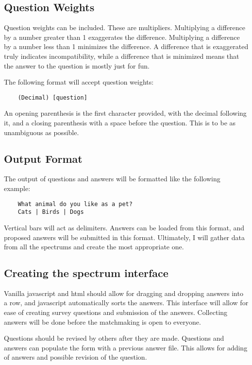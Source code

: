 \documentclass[12pt]{article}
\begin{document}
\subsection{Question Weights}
Question weights can be included. These are multipliers. Multiplying a
difference by a number greater than 1 exaggerates the difference. Multiplying a
difference by a number less than 1 minimizes the difference. A difference that
is exaggerated truly indicates incompatibility, while a difference that is
minimized means that the answer to the question is mostly just for fun.

The following format will accept question weights:

\begin{verbatim}
    (Decimal) [question]
\end{verbatim}

An opening parenthesis is the first character provided, with the decimal
following it, and a closing parenthesis with a space before the question. This
is to be as unambiguous as possible.

\subsection{Output Format}
The output of questions and answers will be formatted like the following
example:

\begin{verbatim}
    What animal do you like as a pet?
    Cats | Birds | Dogs
\end{verbatim}

Vertical bars will act as delimiters. Answers can be loaded from this format,
and proposed answers will be submitted in this format. Ultimately, I will gather
data from all the spectrums and create the most appropriate one.

\subsection{Creating the spectrum interface}
Vanilla javascript and html should allow for dragging and dropping answers into
a row, and javascript automatically sorts the answers. This interface will
allow for ease of creating survey questions and submission of the answers.
Collecting answers will be done before the matchmaking is open to everyone.

Questions should be revised by others after they are made. Questions and answers
can populate the form with a previous answer file. This allows for adding of
answers and possible revision of the question.
\end{document}
